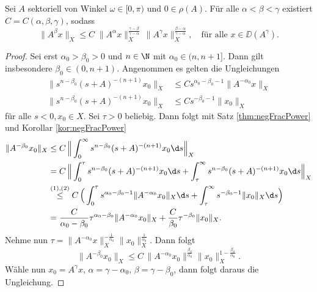 \begin{thm}[Momentenungleichung]
  \label{thm:moment}
  Sei $A$ sektoriell von Winkel $\omega \in [0,\pi)$ und $0 \in \rho(A)$.
  Für alle $\alpha < \beta < \gamma$ existiert $C = C(\alpha, \beta, \gamma)$, sodass
  $$
  \| A^\beta x\|_X^{\frac{}{}} \leq C\; \|A^\alpha x\|_X^{\frac{\gamma - \beta}{\gamma - \alpha}} \, \|A^\gamma x \|_X^{\frac{\beta - \alpha}{\gamma - \alpha}}, \quad\text{für alle }x \in \DD(A^\gamma).
  $$
\end{thm}

\begin{proof}
Sei erst $\alpha_0 > \beta_0 > 0$ und $n \in \N$ mit $\alpha_0 \in (n, n + 1]$. 
Dann gilt insbesondere $\beta_0 \in (0,n+1)$.
Angenommen es gelten die Ungleichungen
\begin{align}
  \|s^{n - \beta_0} (s + A)^{-(n + 1)} x_0 \|_X &
  \leq C s^{\alpha_0 - \beta_0 - 1} \|A^{-\alpha_0} x\|_X \tag{1} \\
  \|s^{n - \beta_0} (s+ A)^{-(n + 1)} x_0 \|_X &
  \leq C s^{-\beta_0 - 1} \|x_0\|_X \tag{2}
\end{align}
für alle $s < 0, x_0 \in X$. 
Sei $\tau > 0$ beliebig. Dann folgt mit Satz \ref{thm:negFracPower} und Korollar \ref{kor:negFracPower}
\begin{align*}
  \|A^{-\beta_0} x_0 \|_X
  &\leq C \, \Big\|\int_0^\infty s^{n - \beta_0} (s + A)^{-(n+1)} x_0 \d s \Big\|_X \\
  &= C \, \Big\| \int_0^\tau s^{n - \beta_0} (s + A)^{-(n + 1)} x_0 \d s  + \int_\tau^\infty s^{n - \beta_0} (s + A)^{-(n + 1)} x_0 \d s\Big\|_X \\
  &\overset{\text{(1),(2)}}{\leq} C \, \Big( \int_0^\tau s^{\alpha_0 - \beta_0 - 1} \| A^{-\alpha_0} x_0 \|_X \d s + \int_\tau^\infty s^{-\beta_0 - 1} \|x_0\|_X \d s \Big) \\
  &= \frac{C}{\alpha_0 - \beta_0} \tau^{\alpha_0 - \beta_0} \|A^{-\alpha_0} x_0 \|_X + \frac{C}{\beta_0} \tau^{-\beta_0} \|x_0\|_X.
\end{align*}
  Nehme nun $\tau = \|A ^{-\alpha_0} x\|_X^{-\frac{1}{\alpha_0}} \|x_0\|_X^{\frac{1}{\alpha_0}}$. 
  Dann folgt
  $$
  \|A^{-\beta_0} x_0\|_X \leq C \, \|A^{-\alpha_0} x_0\|^{\frac{\beta_0}{\alpha_0}} \|x_0\|_X^{1 - \frac{\beta_0}{\alpha_0}}.
  $$
  Wähle nun $x_0 = A^\gamma x$, $\alpha = \gamma - \alpha_0$, $\beta = \gamma - \beta_0$, dann folgt daraus die Ungleichung.


\end{proof}
